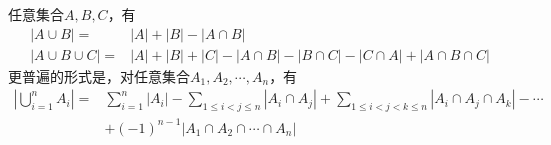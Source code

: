 \begin{theorem}
  任意集合$A,B,C$，有
  \begin{align*}
    |A\cup B| ={}&       |A| + |B| - |A\cap B|\\
    |A\cup B\cup C| ={}& |A| + |B| + |C| - |A\cap B| - |B\cap C| - |C\cap A| + |A\cap B\cap C|
  \end{align*}
  更普遍的形式是，对任意集合$A_1,A_2,\cdots,A_n$，有
  \begin{align*}
    \left|\bigcup_{i=1}^n A_i\right| ={}& \sum_{i=1}^n\left|A_i\right|
    - \sum_{1\le i<j\le n}\left|A_i\cap A_j\right| + \sum_{1\le i<j<k\le n}\left|A_i\cap A_j\cap A_k\right| - \cdots\\
    & + (-1)^{n-1}\left|A_1\cap A_2\cap \cdots \cap A_n\right|
  \end{align*}
\end{theorem}
